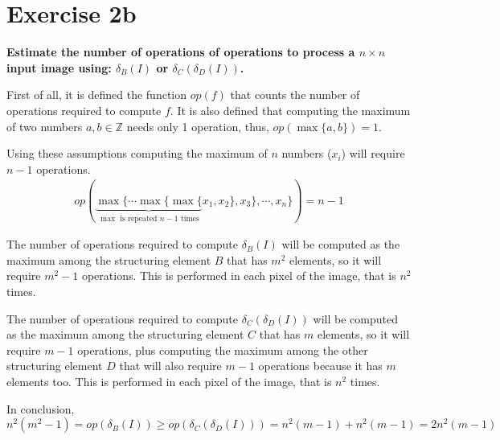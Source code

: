 \section*{Exercise 2b}

{
\bfseries
Estimate the number of operations of operations to process a $n \times n$ input image using: $\delta_B(I)$ or $\delta_C\left(\delta_D \left( I \right) \right)$.
}

\begin{center}
\end{center}

First of all, it is defined the function $op(f)$ that counts the number of operations required to compute $f$. It is also defined that computing the maximum of two numbers $a, b \in \mathbb{Z}$ needs only 1 operation, thus, $op\left(\max\{a, b\}\right) = 1$.

Using these assumptions computing the maximum of $n$ numbers ($x_i$) will require $n - 1$ operations.
\begin{gather*}
    op(\underbrace{\max\{\cdots\max\{\max\{}_{\max{} \text{ is repeated } n - 1 \text{ times}}x_1, x_2\}, x_3\},\cdots,x_n\}) = n - 1
\end{gather*}

The number of operations required to compute $\delta_B(I)$ will be computed as the maximum among the structuring element $B$ that has $m^2$ elements, so it will require $m^2 - 1$ operations. This is performed in each pixel of the image, that is $n^2$ times.

The number of operations required to compute $\delta_C\left(\delta_D \left( I \right) \right)$ will be computed as the maximum among the structuring element $C$ that has $m$ elements, so it will require $m - 1$ operations, plus computing the maximum among the other structuring element $D$ that will also require $m - 1$ operations because it has $m$ elements too. This is performed in each pixel of the image, that is $n^2$ times.

In conclusion,
$$
    n^2(m^2 - 1) = op\left(\delta_B(I)\right) \geq op\left(\delta_C\left(\delta_D \left( I \right) \right)\right) = n^2(m - 1) + n^2(m - 1) = 2n^2(m - 1)
$$
